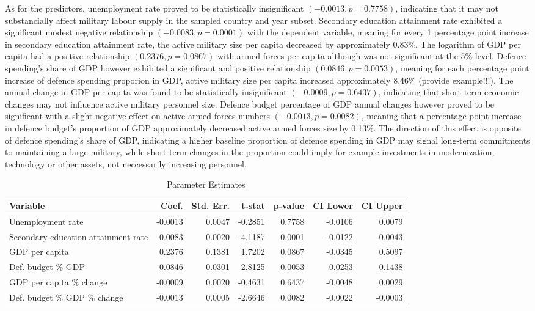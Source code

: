 As for the predictors, unemployment rate proved to be statistically insignificant $(-0.0013, p=0.7758)$, 
indicating that it may not substancially affect military labour supply in the sampled country and year subset.
Secondary education attainment rate exhibited a significant modest negative relationship $(-0.0083, p=0.0001)$ 
with the dependent variable, meaning for every 1 percentage point increase in secondary education 
attainment rate, the active military size per capita decreased by approximately 0.83\%.
The logarithm of GDP per capita had a positive relationship $(0.2376, p=0.0867)$ with armed forces per capita 
although was not significant at the 5\% level. Defence spending's share of GDP however exhibited 
a significant and positive relationship $(0.0846, p=0.0053)$, meaning for each percentage point increase of defence spending 
proporion in GDP, active military size per capita increased approximately 8.46\% (provide example!!!).
The annual change in GDP per capita was found to be statistically insignificant $(-0.0009, p=0.6437)$,
indicating that short term economic changes may not influence active military personnel size.
Defence budget percentage of GDP annual changes however proved to be significant with a slight negative effect 
on active armed forces numbers $(-0.0013, p=0.0082)$, meaning that a percentage point increase in defence 
budget's proportion of GDP approximately decreased active armed forces size by 0.13\%. The direction of 
this effect is opposite of defence spending's share of GDP, indicating a higher baseline proportion of defence 
spending in GDP may signal long-term commitments to maintaining a large military, while short term 
changes in the proportion could imply for example investments in modernization, technology or other 
assets, not neccessarily increasing personnel.

\begin{table}[htbp]
\centering
\begin{threeparttable}
\caption{Parameter Estimates}
\label{tab:parameter_estimates}
\begin{tabularx}{\textwidth}{@{}Xrrrrrr@{}}
\toprule
\textbf{Variable} & \textbf{Coef.} & \textbf{Std. Err.} & \textbf{t-stat} & \textbf{p-value} & \textbf{CI Lower} & \textbf{CI Upper} \\
\midrule
Unemployment rate & -0.0013 & 0.0047 & -0.2851 & 0.7758 & -0.0106 & 0.0079 \\
Secondary education attainment rate & -0.0083 & 0.0020 & -4.1187 & 0.0001 & -0.0122 & -0.0043 \\
GDP per capita & 0.2376 & 0.1381 & 1.7202 & 0.0867 & -0.0345 & 0.5097 \\
Def. budget \% GDP & 0.0846 & 0.0301 & 2.8125 & 0.0053 & 0.0253 & 0.1438 \\
GDP per capita \% change & -0.0009 & 0.0020 & -0.4631 & 0.6437 & -0.0048 & 0.0029 \\
Def. budget \% GDP \% change & -0.0013 & 0.0005 & -2.6646 & 0.0082 & -0.0022 & -0.0003 \\
\bottomrule
\end{tabularx}
\end{threeparttable}
\label{tab:final_model}
\end{table}